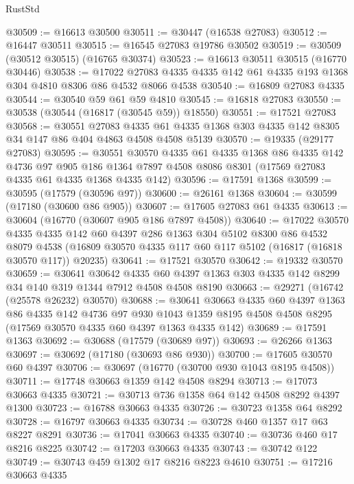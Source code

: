 \begin{lexlean}{RustStd}
\begin{coremodule}
{\begin{coremodule}
{{{{{{{{{{{{{{{{{{{{{{{{{{{{{{{{{{{{{{{{{{{{{{{{{{{{{{{@30509 := @16613 @30500
@30511 := @30447 (@16538 @27083)
@30512 := @16447 @30511
@30515 := @16545 @27083 @19786 @30502
@30519 := @30509 (@30512 @30515) (@16765 @30374)
@30523 := @16613 @30511 @30515 (@16770 @30446)
@30538 := @17022 @27083 @4335 @4335 @142 @61 @4335 @193 @1368 @304 @4810 @8306 @86 @4532 @8066 @4538
@30540 := @16809 @27083 @4335
@30544 := @30540 @59 @61 @59 @4810
@30545 := @16818 @27083
@30550 := @30538 (@30544 (@16817 (@30545 @59)) @18550)
@30551 := @17521 @27083
@30568 := @30551
    @27083
    @4335
    @61
    @4335
    @1368
    @303
    @4335
    @142
    @8305
    @34
    @147
    @86
    @404
    @4863
    @4508
    @4508
    @5139
@30570 := @19335 (@29177 @27083)
@30595 := @30551
    @30570
    @4335
    @61
    @4335
    @1368
    @86
    @4335
    @142
    @4736
    @97
    @905
    @186
    @1364
    @7897
    @4508
    @8086
    @8301
    (@17569 @27083 @4335 @61 @4335 @1368 @4335 @142)
@30596 := @17591 @1368
@30599 := @30595 (@17579 (@30596 @97))
@30600 := @26161 @1368
@30604 := @30599 (@17180 (@30600 @86 @905))
@30607 := @17605 @27083 @61 @4335
@30613 := @30604 (@16770 (@30607 @905 @186 @7897 @4508))
@30640 := @17022
    @30570
    @4335
    @4335
    @142
    @60
    @4397
    @286
    @1363
    @304
    @5102
    @8300
    @86
    @4532
    @8079
    @4538
    (@16809 @30570 @4335 @117 @60 @117 @5102 (@16817 (@16818 @30570 @117)) @20235)
@30641 := @17521 @30570
@30642 := @19332 @30570
@30659 := @30641
    @30642
    @4335
    @60
    @4397
    @1363
    @303
    @4335
    @142
    @8299
    @34
    @140
    @319
    @1344
    @7912
    @4508
    @4508
    @8190
@30663 := @29271 (@16742 (@25578 @26232) @30570)
@30688 := @30641
    @30663
    @4335
    @60
    @4397
    @1363
    @86
    @4335
    @142
    @4736
    @97
    @930
    @1043
    @1359
    @8195
    @4508
    @4508
    @8295
    (@17569 @30570 @4335 @60 @4397 @1363 @4335 @142)
@30689 := @17591 @1363
@30692 := @30688 (@17579 (@30689 @97))
@30693 := @26266 @1363
@30697 := @30692 (@17180 (@30693 @86 @930))
@30700 := @17605 @30570 @60 @4397
@30706 := @30697 (@16770 (@30700 @930 @1043 @8195 @4508))
@30711 := @17748 @30663 @1359 @142 @4508 @8294
@30713 := @17073 @30663 @4335
@30721 := @30713 @736 @1358 @64 @142 @4508 @8292 @4397 @1300
@30723 := @16788 @30663 @4335
@30726 := @30723 @1358 @64 @8292
@30728 := @16797 @30663 @4335
@30734 := @30728 @460 @1357 @17 @63 @8227 @8291
@30736 := @17041 @30663 @4335
@30740 := @30736 @460 @17 @8216 @8225
@30742 := @17203 @30663 @4335
@30743 := @30742 @122
@30749 := @30743 @459 @1302 @17 @8216 @8223 @4610
@30751 := @17216 @30663 @4335
}}}}}}}}}}}}}}}}}}}}}}}}}}}}}}}}}}}}}}}}}}}}}}}}}}}}}}}
\end{coremodule}}
\end{coremodule}
\end{lexlean}
